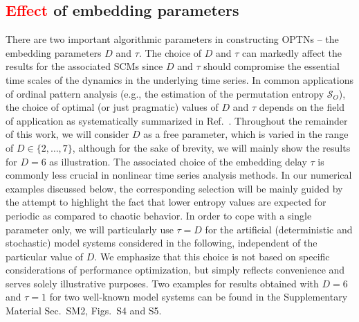 \documentclass[aip,cha,reprint,nofootinbib]{revtex4-1}
\begin{document}
\subsection{\textcolor{red}{Effect} of embedding parameters} \label{sec:embeddings}
There are two important algorithmic parameters in constructing OPTNs -- the embedding parameters $D$ and $\tau$. The choice of $D$ and $\tau$ can markedly affect the results for the associated SCMs since $D$ and $\tau$ should compromise the essential time scales of the dynamics in the underlying time series. In common applications of ordinal pattern analysis (e.g., the estimation of the permutation entropy $\mathcal{S}_O$), the choice of optimal (or just pragmatic) values of $D$ and $\tau$ depends on the field of application as systematically summarized in Ref.~\cite{Riedl2013}. {\color{red}Throughout the remainder of this work, we will consider $D$ as a free parameter, which is varied in the range of $D \in \{2,\ldots,7\}$, although for the sake of brevity, we will mainly show the results for $D = 6$ as illustration. The associated choice of the embedding delay $\tau$ is commonly less crucial in nonlinear time series analysis methods. In our numerical examples discussed below, the corresponding selection will be mainly guided by the attempt to highlight the fact that lower entropy values are expected for periodic as compared to chaotic behavior. In order to cope with a single parameter only, we will particularly use $\tau=D$ for the artificial (deterministic and stochastic) model systems considered in the following, independent of the particular value of $D$. We emphasize that this choice is not based on specific considerations of performance optimization, but simply reflects convenience and serves solely illustrative purposes. Two examples for results obtained with $D=6$ and $\tau=1$ for two well-known model systems can be found in the Supplementary Material Sec.~SM2, Figs.~S4 and S5.}
\end{document}
